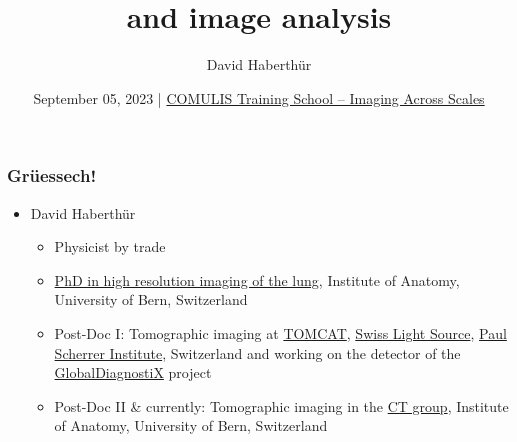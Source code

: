 \documentclass[aspectratio=169]{beamer}
\title{\uct and image analysis}
\author{David Haberthür}
\institute{Institute of Anatomy\\University of Bern\\Switzerland}
\date{September 05, 2023 | \href{https://www.ana.unibe.ch/continuing_education/comulis_training_school/}{COMULIS Training School -- Imaging Across Scales}}
\newcommand{\uct}{{\textmu}CT\xspace}%
\begin{document}
{%
	\begin{frame}%
		\maketitle
	\end{frame}%
}

\begin{frame}
	\frametitle{Grüessech!}
	\begin{itemize}
		\item David Haberthür
		\begin{itemize}
			\item Physicist by trade
			\item \href{https://boris.unibe.ch/2619/}{PhD in high resolution imaging of the lung}, Institute of Anatomy, University of Bern, Switzerland
			\item Post-Doc I: Tomographic imaging at \href{https://www.psi.ch/sls/tomcat/}{TOMCAT}, \href{https://www.psi.ch/sls/}{Swiss Light Source}, \href{https://www.psi.ch/}{Paul Scherrer Institute}, Switzerland and working on the detector of the \href{http://globaldiagnostix.org}{GlobalDiagnostiX} project
			\item Post-Doc II \& currently: Tomographic imaging in the \href{https://www.ana.unibe.ch/forschung/mikroct/research/}{\uct group}, Institute of Anatomy, University of Bern, Switzerland
		\end{itemize}
	\end{itemize}
\end{frame}
\end{document}
